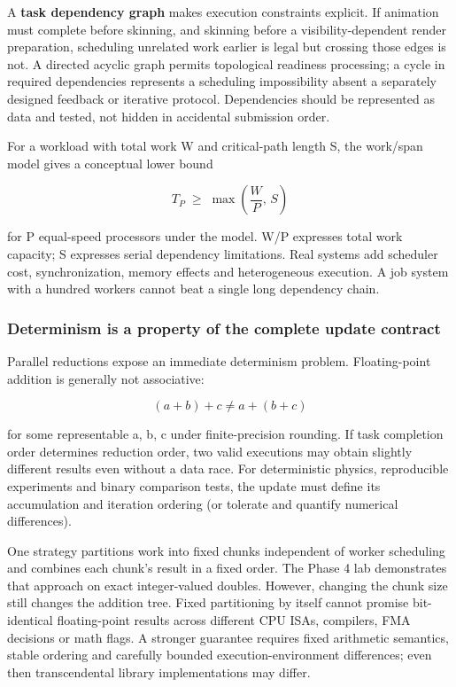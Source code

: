 A \textbf{task dependency graph} makes execution constraints explicit. If animation must complete before skinning, and skinning before a visibility-dependent render preparation, scheduling unrelated work earlier is legal but crossing those edges is not. A directed acyclic graph permits topological readiness processing; a cycle in required dependencies represents a scheduling impossibility absent a separately designed feedback or iterative protocol. Dependencies should be represented as data and tested, not hidden in accidental submission order.

For a workload with total work W and critical-path length S, the work/span model gives a conceptual lower bound

\[
T_P\;\geq\;\max\!\left(\frac{W}{P},\, S\right)
\]

for P equal-speed processors under the model. W/P expresses total work capacity; S expresses serial dependency limitations. Real systems add scheduler cost, synchronization, memory effects and heterogeneous execution. A job system with a hundred workers cannot beat a single long dependency chain.

\subsubsection{Determinism is a property of the complete update contract}\label{determinism-is-a-property-of-the-complete-update-contract}

Parallel reductions expose an immediate determinism problem. Floating-point addition is generally not associative:

\[
(a+b)+c\neq a+(b+c)
\]

for some representable a, b, c under finite-precision rounding. If task completion order determines reduction order, two valid executions may obtain slightly different results even without a data race. For deterministic physics, reproducible experiments and binary comparison tests, the update must define its accumulation and iteration ordering (or tolerate and quantify numerical differences).

One strategy partitions work into fixed chunks independent of worker scheduling and combines each chunk's result in a fixed order. The Phase 4 lab demonstrates that approach on exact integer-valued doubles. However, changing the chunk size still changes the addition tree. Fixed partitioning by itself cannot promise bit-identical floating-point results across different CPU ISAs, compilers, FMA decisions or math flags. A stronger guarantee requires fixed arithmetic semantics, stable ordering and carefully bounded execution-environment differences; even then transcendental library implementations may differ.

